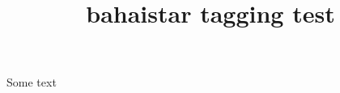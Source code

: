 \documentclass{article}
\title{bahaistar tagging test}
\begin{document}
Some text \bahaistar
\end{document}
